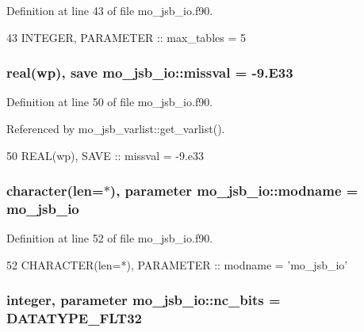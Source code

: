 Definition at line 43 of file mo\+\_\+jsb\+\_\+io.\+f90.


\begin{DoxyCode}
43   \textcolor{keywordtype}{INTEGER}, \textcolor{keywordtype}{PARAMETER} :: max\_tables = 5
\end{DoxyCode}
\hypertarget{namespacemo__jsb__io_a390ce09c37f32f811fcbc4988d94dec9}{}
\subsubsection[{missval}]{\setlength{\rightskip}{0pt plus 5cm}real(wp), save mo\+\_\+jsb\+\_\+io\+::missval = -\/9.E33}\label{namespacemo__jsb__io_a390ce09c37f32f811fcbc4988d94dec9}


Definition at line 50 of file mo\+\_\+jsb\+\_\+io.\+f90.



Referenced by mo\+\_\+jsb\+\_\+varlist\+::get\+\_\+varlist().


\begin{DoxyCode}
50   \textcolor{keywordtype}{REAL(wp)}, \textcolor{keywordtype}{SAVE} :: missval = -9.e33
\end{DoxyCode}
\hypertarget{namespacemo__jsb__io_a610da1f729e46e7946c4b868a8f677c2}{}
\subsubsection[{modname}]{\setlength{\rightskip}{0pt plus 5cm}character(len=$\ast$), parameter mo\+\_\+jsb\+\_\+io\+::modname = \textquotesingle{}mo\+\_\+jsb\+\_\+io\textquotesingle{}}\label{namespacemo__jsb__io_a610da1f729e46e7946c4b868a8f677c2}


Definition at line 52 of file mo\+\_\+jsb\+\_\+io.\+f90.


\begin{DoxyCode}
52   \textcolor{keywordtype}{CHARACTER(len=*)}, \textcolor{keywordtype}{PARAMETER} :: modname = \textcolor{stringliteral}{'mo\_jsb\_io'}
\end{DoxyCode}
\hypertarget{namespacemo__jsb__io_a4bf2b656fa0a7acf938f0bfcad5870e3}{}
\subsubsection[{nc\+\_\+bits}]{\setlength{\rightskip}{0pt plus 5cm}integer, parameter mo\+\_\+jsb\+\_\+io\+::nc\+\_\+bits = D\+A\+T\+A\+T\+Y\+P\+E\+\_\+\+F\+L\+T32}\label{namespacemo__jsb__io_a4bf2b656fa0a7acf938f0bfcad5870e3}


